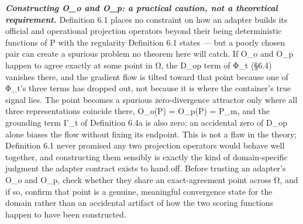 \documentclass[
]{article}
\begin{document}
\emph{\textbf{Constructing O\_o and O\_p: a practical caution, not a
theoretical requirement.}} Definition 6.1 places no constraint on how an
adapter builds its official and operational projection operators beyond
their being deterministic functions of P with the regularity Definition
6.1 states --- but a poorly chosen pair can create a spurious problem no
theorem here will catch. If O\_o and O\_p happen to agree exactly at
some point in Ω, the D\_op term of Φ\_t (§6.4) vanishes there, and the
gradient flow is tilted toward that point because one of Φ\_t's three
terms has dropped out, not because it is where the container's true
signal lies. The point becomes a spurious zero-divergence attractor only
where all three representations coincide there, O\_o(P) = O\_p(P) =
P\_m, and the grounding term Γ\_t of Definition 6.4a is also zero; an
accidental zero of D\_op alone biases the flow without fixing its
endpoint. This is not a flaw in the theory; Definition 6.1 never
promised any two projection operators would behave well together, and
constructing them sensibly is exactly the kind of domain-specific
judgment the adapter contract exists to hand off. Before trusting an
adapter's O\_o and O\_p, check whether they share an exact-agreement
point across Ω, and if so, confirm that point is a genuine, meaningful
convergence state for the domain rather than an accidental artifact of
how the two scoring functions happen to have been constructed.
\end{document}
